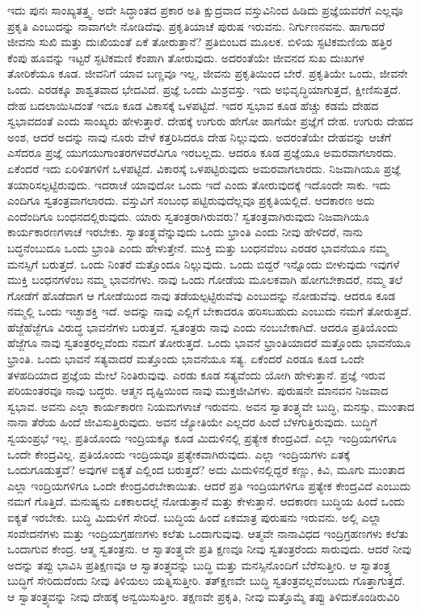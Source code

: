 ಇದು ಪುನಃ ಸಾಂಖ್ಯತತ್ತ್ವ. ಅದೇ ಸಿದ್ಧಾಂತದ ಪ್ರಕಾರ ಅತಿ ಕ್ಷುದ್ರವಾದ ವಸ್ತುವಿನಿಂದ ಹಿಡಿದು ಪ್ರಜ್ಞೆಯವರೆಗೆ ಎಲ್ಲವೂ ಪ್ರಕೃತಿ ಎಂಬುದನ್ನು ನಾವಾಗಲೇ ನೋಡಿದೆವು. ಪ್ರಕೃತಿಯಾಚೆ ಪುರುಷ ಇರುವನು. ನಿರ್ಗುಣನವನು. ಹಾಗಾದರೆ ಜೀವನು ಸುಖಿ ಮತ್ತು ದುಃಖಿಯಂತೆ ಏಕೆ ತೋರುತ್ತಾನೆ? ಪ್ರತಿಬಿಂಬದ ಮೂಲಕ. ಬಿಳಿಯ ಸ್ಫಟಿಕಮಣಿಯ ಹತ್ತಿರ ಕೆಂಪು ಹೂವನ್ನು ಇಟ್ಟರೆ ಸ್ಫಟಿಕಮಣಿ ಕೆಂಪಾಗಿ ತೋರುವುದು. ಅದರಂತೆಯೇ ಜೀವನದ ಸುಖ ದುಃಖಗಳ ತೋರಿಕೆಯೂ ಕೂಡ. ಜೀವನಿಗೆ ಯಾವ ಬಣ್ಣವೂ ಇಲ್ಲ, ಜೀವನು ಪ್ರಕೃತಿಯಿಂದ ಬೇರೆ. ಪ್ರಕೃತಿಯೇ ಒಂದು, ಜೀವನೇ ಒಂದು. ಎರಡಕ್ಕೂ ಶಾಶ್ವತವಾದ ಭೇದವಿದೆ. ಪ್ರಜ್ಞೆ ಒಂದು ಮಿಶ್ರವಸ್ತು. ಇದು ಅಭಿವೃದ್ಧಿಯಾಗುತ್ತದೆ, ಕ್ಷೀಣಿಸುತ್ತದೆ. ದೇಹ ಬದಲಾಯಿಸಿದಂತೆ ಇದೂ ಕೂಡ ವಿಕಾಸಕ್ಕೆ ಒಳಪಟ್ಟಿದೆ. ಇದರ ಸ್ವಭಾವ ಕೂಡ ಹೆಚ್ಚು ಕಡಮೆ ದೇಹದ ಸ್ವಭಾವದಂತೆ ಎಂದು ಸಾಂಖ್ಯರು ಹೇಳುತ್ತಾರೆ. ದೇಹಕ್ಕೆ ಉಗುರು ಹೇಗೋ ಹಾಗೆಯೇ ಪ್ರಜ್ಞೆಗೆ ದೇಹ. ಉಗುರು ದೇಹದ ಅಂಶ, ಆದರೆ ಅದನ್ನು ನಾವು ನೂರು ವೇಳೆ ಕತ್ತರಿಸಿದರೂ ದೇಹ ನಿಲ್ಲುವುದು. ಅದರಂತೆಯೇ ದೇಹವನ್ನು ಆಚೆಗೆ ಎಸೆದರೂ ಪ್ರಜ್ಞೆ ಯುಗಯುಗಾಂತರಗಳವರೆವಿಗೂ ಇರಬಲ್ಲದು. ಆದರೂ ಕೂಡ ಪ್ರಜ್ಞೆಯೂ ಅಮರವಾಗಲಾರದು. ಏಕೆಂದರೆ ಇದು ಏರಿಳಿತಗಳಿಗೆ ಒಳಪಟ್ಟಿದೆ. ವಿಕಾರಸ್ಕೆ ಒಳಪಟ್ಟಿರುವುದು ಅಮರವಾಗಲಾರದು. ನಿಜವಾಗಿಯೂ ಪ್ರಜ್ಞೆ ತಯಾರಿಸಲ್ಪಟ್ಟಿರುವುದು. ಇದರಾಚೆ ಯಾವುದೋ ಒಂದು ಇದೆ ಎಂದು ತೋರುವುದಕ್ಕೆ ಇದೊಂದೇ ಸಾಕು. ಇದು ಎಂದಿಗೂ ಸ್ವತಂತ್ರವಾಗಲಾರದು. ವಸ್ತುವಿಗೆ ಸಂಬಂಧ ಪಟ್ಟಿರುವುದೆಲ್ಲವೂ ಪ್ರಕೃತಿಯಲ್ಲಿದೆ. ಆದಕಾರಣ ಅದು ಎಂದೆಂದಿಗೂ ಬಂಧನದಲ್ಲಿರುವುದು. ಯಾರು ಸ್ವತಂತ್ರರಾಗಿರುವರು? ಸ್ವತಂತ್ರವಾಗಿರುವುದು ನಿಜವಾಗಿಯೂ ಕಾರ್ಯಕಾರಣಗಳಾಚೆ ಇರಬೇಕು. ಸ್ವಾತಂತ್ರ್ಯವೆನ್ನುವುದು ಒಂದು ಭ್ರಾಂತಿ ಎಂದು ನೀವು ಹೇಳಿದರೆ, ನಾನು ಬದ್ಧನೆಂಬುದೂ ಒಂದು ಭ್ರಾಂತಿ ಎಂದು ಹೇಳುತ್ತೇನೆ. ಮುಕ್ತಿ ಮತ್ತು ಬಂಧನವೆಂಬ ಎರಡರ ಭಾವನೆಯೂ ನಮ್ಮ ಮನಸ್ಸಿಗೆ ಬರುತ್ತದೆ. ಒಂದು ನಿಂತರೆ ಮತ್ತೊಂದೂ ನಿಲ್ಲುವುದು. ಒಂದು ಬಿದ್ದರೆ ಇನ್ನೊಂದು ಬೀಳುವುದು ಇವುಗಳೆ ಮುಕ್ತಿ ಬಂಧನಗಳೆಂಬ ನಮ್ಮ ಭಾವನೆಗಳು. ನಾವು ಒಂದು ಗೋಡೆಯ ಮೂಲಕವಾಗಿ ಹೋಗಬೇಕಾದರೆ, ನಮ್ಮ ತಲೆ ಗೋಡೆಗೆ ಹೊಡೆದಾಗ ಆ ಗೋಡೆಯಿಂದ ನಾವು ತಡೆಯಲ್ಪಟ್ಟಿರುವೆವು ಎಂಬುದನ್ನು ನೋಡುವೆವು. ಆದರೂ ಕೂಡ ನಮ್ಮಲ್ಲಿ ಒಂದು ಇಚ್ಛಾಶಕ್ತಿ ಇದೆ. ಅದನ್ನು ನಾವು ಎಲ್ಲಿಗೆ ಬೇಕಾದರೂ ಹರಿಸಬಹುದು ಎಂಬುದು ನಮಗೆ ತೋರುತ್ತದೆ. ಹೆಜ್ಜೆಹೆಜ್ಜೆಗೂ ವಿರುದ್ಧ ಭಾವನೆಗಳು ಬರುತ್ತವೆ. ಸ್ವತಂತ್ರರು ನಾವು ಎಂದು ನಂಬಬೇಕಾಗಿದೆ. ಆದರೂ ಪ್ರತಿಯೊಂದು ಹೆಜ್ಜೆಗೂ ನಾವು ಸ್ವತಂತ್ರರಲ್ಲವೆಂದು ನಮಗೆ ತೋರುತ್ತದೆ. ಒಂದು ಭಾವನೆ ಭ್ರಾಂತಿಯಾದರೆ ಮತ್ತೊಂದು ಭಾವನೆಯೂ ಭ್ರಾಂತಿ. ಒಂದು ಭಾವನೆ ಸತ್ಯವಾದರೆ ಮತ್ತೊಂದು ಭಾವನೆಯೂ ಸತ್ಯ. ಏಕೆಂದರೆ ಎರಡೂ ಕೂಡ ಒಂದೇ ತಳಹದಿಯಾದ ಪ್ರಜ್ಞೆಯ ಮೇಲೆ ನಿಂತಿರುವುವು. ಎರಡು ಕೂಡ ಸತ್ಯವೆಂದು ಯೋಗಿ ಹೇಳುತ್ತಾನೆ. ಪ್ರಜ್ಞೆ ಇರುವ ಪರಿಯಂತರವೂ ನಾವು ಬದ್ಧರು. ಆತ್ಮನ ದೃಷ್ಟಿಯಿಂದ ನಾವು ಮುಕ್ತಜೀವಿಗಳು. ಪುರುಷನೇ ಮಾನವನ ನಿಜವಾದ ಸ್ವಭಾವ. ಅವನು ಎಲ್ಲಾ ಕಾರ್ಯಕಾರಣ ನಿಯಮಗಳಾಚೆ ಇರುವನು. ಅವನ ಸ್ವಾತಂತ್ರ್ಯವೇ ಬುದ್ಧಿ, ಮನಸ್ಸು, ಮುಂತಾದ ನಾನಾ ತೆರೆಯ ಹಿಂದೆ ಜೀವಿಸುತ್ತಿರುವುದು. ಅವನ ಜ್ಯೋತಿಯೇ ಎಲ್ಲದರ ಹಿಂದೆ ಬೆಳಗುತ್ತಿರುವುದು. ಬುದ್ಧಿಗೆ ಸ್ವಯಂಪ್ರಭೆ ಇಲ್ಲ. ಪ್ರತಿಯೊಂದು ಇಂದ್ರಿಯಕ್ಕೂ ಕೂಡ ಮಿದುಳಿನಲ್ಲಿ ಪ್ರತ್ಯೇಕ ಕೇಂದ್ರವಿದೆ. ಎಲ್ಲಾ ಇಂದ್ರಿಯಗಳಿಗೂ ಒಂದೇ ಕೇಂದ್ರವಿಲ್ಲ. ಪ್ರತಿಯೊಂದು ಇಂದ್ರಿಯವೂ ಪ್ರತ್ಯೇಕವಾಗಿರುವುದು. ಎಲ್ಲಾ ಇಂದ್ರಿಯಗಳು ಏತಕ್ಕೆ ಒಂದುಗೂಡುತ್ತವೆ? ಅವುಗಳ ಐಕ್ಯತೆ ಎಲ್ಲಿಂದ ಬರುತ್ತದೆ? ಅದು ಮಿದುಳಿನಲ್ಲಿದ್ದರೆ ಕಣ್ಣು, ಕಿವಿ, ಮೂಗು ಮುಂತಾದ ಎಲ್ಲಾ ಇಂದ್ರಿಯಗಳಿಗೂ ಒಂದೇ ಕೇಂದ್ರವಿರಬೇಕಾಯಿತು. ಆದರೆ ಪ್ರತಿ ಇಂದ್ರಿಯಗಳಿಗೂ ಪ್ರತ್ಯೇಕ ಕೇಂದ್ರವಿದೆ ಎಂಬುದು ನಮಗೆ ಗೊತ್ತಿದೆ. ಮನುಷ್ಯನು ಏಕಕಾಲದಲ್ಲೆ ನೋಡುತ್ತಾನೆ ಮತ್ತು ಕೇಳುತ್ತಾನೆ. ಆದಕಾರಣ ಬುದ್ಧಿಯ ಹಿಂದೆ ಒಂದು ಐಕ್ಯತೆ ಇರಬೇಕು. ಬುದ್ಧಿ ಮಿದುಳಿಗೆ ಸೇರಿದೆ. ಬುದ್ಧಿಯ ಹಿಂದೆ ಏಕಮಾತ್ರ ಪುರುಷನು ಇರುವನು. ಅಲ್ಲಿ ಎಲ್ಲಾ ಸಂವೇದನೆಗಳು ಮತ್ತು ಇಂದ್ರಿಯಗ್ರಹಣಗಳು ಕಲೆತು ಒಂದಾಗುವುವು. ಆತ್ಮವೇ ನಾನಾವಿಧದ ಇಂದ್ರಿಗ್ರಹಣಗಳು ಕಲೆತು ಒಂದಾಗುವ ಕೇಂದ್ರ. ಆತ್ಮ ಸ್ವತಂತ್ರನು. ಆ ಸ್ವಾತಂತ್ರ್ಯವೇ ಪ್ರತಿ ಕ್ಷಣವೂ ನೀವು ಸ್ವತಂತ್ರರೆಂದು ಸಾರುವುದು. ಆದರೆ ನೀವು ಅದನ್ನು ತಪ್ಪು ಭಾವಿಸಿ ಪ್ರತಿಕ್ಷಣವೂ ಆ ಸ್ವಾತಂತ್ರ್ಯವನ್ನು ಬುದ್ಧಿ ಮತ್ತು ಮನಸ್ಸಿನೊಂದಿಗೆ ಬೆರೆಸುತ್ತೀರಿ. ಆ ಸ್ವಾತಂತ್ರ್ಯ ಬುದ್ಧಿಗೆ ಸೇರಿದುದೆಂದು ನೀವು ತಿಳಿಯಲು ಯತ್ನಿಸುತ್ತೀರಿ. ತತ್​ಕ್ಷಣವೇ ಬುದ್ಧಿ ಸ್ವತಂತ್ರವಲ್ಲವೆಂಬುದು ಗೊತ್ತಾಗುತ್ತದೆ. ಆ ಸ್ವಾತಂತ್ರ್ಯವನ್ನು ನೀವು ದೇಹಕ್ಕೆ ಅನ್ವಯಿಸುತ್ತೀರಿ. ತಕ್ಷಣವೇ ಪ್ರಕೃತಿ, ನೀವು ಮತ್ತೊಮ್ಮೆ ತಪ್ಪು ತಿಳಿದುಕೊಂಡಿರುವಿರಿ 
